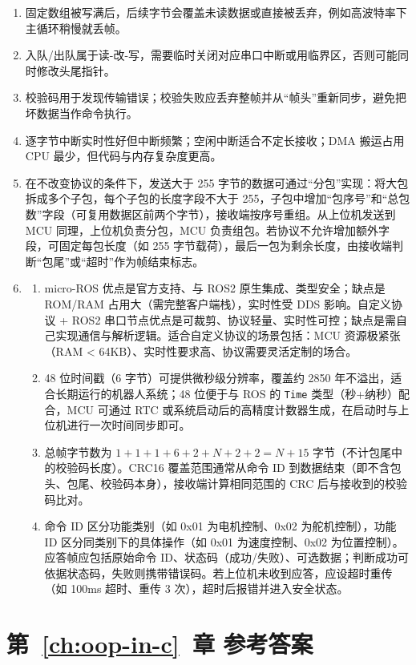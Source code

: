 \begin{enumerate}
	\item 固定数组被写满后，后续字节会覆盖未读数据或直接被丢弃，例如高波特率下主循环稍慢就丢帧。
	\item 入队/出队属于读-改-写，需要临时关闭对应串口中断或用临界区，否则可能同时修改头尾指针。
	\item 校验码用于发现传输错误；校验失败应丢弃整帧并从“帧头”重新同步，避免把坏数据当作命令执行。
	\item 逐字节中断实时性好但中断频繁；空闲中断适合不定长接收；DMA 搬运占用 CPU 最少，但代码与内存复杂度更高。
	\item 在不改变协议的条件下，发送大于 255 字节的数据可通过“分包”实现：将大包拆成多个子包，每个子包的长度字段不大于 255，子包中增加“包序号”和“总包数”字段（可复用数据区前两个字节），接收端按序号重组。从上位机发送到 MCU 同理，上位机负责分包，MCU 负责组包。若协议不允许增加额外字段，可固定每包长度（如 255 字节载荷），最后一包为剩余长度，由接收端判断“包尾”或“超时”作为帧结束标志。
	\item
	\begin{enumerate}
		\item micro-ROS 优点是官方支持、与 ROS2 原生集成、类型安全；缺点是 ROM/RAM 占用大（需完整客户端栈），实时性受 DDS 影响。自定义协议 + ROS2 串口节点优点是可裁剪、协议轻量、实时性可控；缺点是需自己实现通信与解析逻辑。适合自定义协议的场景包括：MCU 资源极紧张（RAM < 64KB）、实时性要求高、协议需要灵活定制的场合。
		\item 48 位时间戳（6 字节）可提供微秒级分辨率，覆盖约 2850 年不溢出，适合长期运行的机器人系统；48 位便于与 ROS 的 \texttt{Time} 类型（秒+纳秒）配合，MCU 可通过 RTC 或系统启动后的高精度计数器生成，在启动时与上位机进行一次时间同步即可。
		\item 总帧字节数为 $1+1+1+6+2+N+2+2 = N+15$ 字节（不计包尾中的校验码长度）。CRC16 覆盖范围通常从命令 ID 到数据结束（即不含包头、包尾、校验码本身），接收端计算相同范围的 CRC 后与接收到的校验码比对。
		\item 命令 ID 区分功能类别（如 0x01 为电机控制、0x02 为舵机控制），功能 ID 区分同类别下的具体操作（如 0x01 为速度控制、0x02 为位置控制）。应答帧应包括原始命令 ID、状态码（成功/失败）、可选数据；判断成功可依据状态码，失败则携带错误码。若上位机未收到应答，应设超时重传（如 100ms 超时、重传 3 次），超时后报错并进入安全状态。
	\end{enumerate}
\end{enumerate}

\section*{第~\ref{ch:oop-in-c}~章 参考答案}

